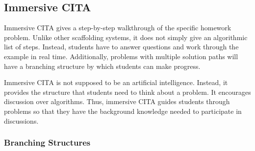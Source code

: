 \subsection{Immersive CITA}

Immersive CITA gives a step-by-step walkthrough of the specific homework problem. Unlike other scaffolding systems, it does not simply give an algorithmic list of steps. Instead, students have to answer questions and work through the example in real time. Additionally, problems with multiple solution paths will have a branching structure by which students can make progress.

Immersive CITA is not supposed to be an artificial intelligence. Instead, it provides the structure that students need to think about a problem. It encourages discussion over algorithms. Thus, immersive CITA guides students through problems so that they have the background knowledge needed to participate in discussions.

\subsubsection{Branching Structures}

\pagebreak

